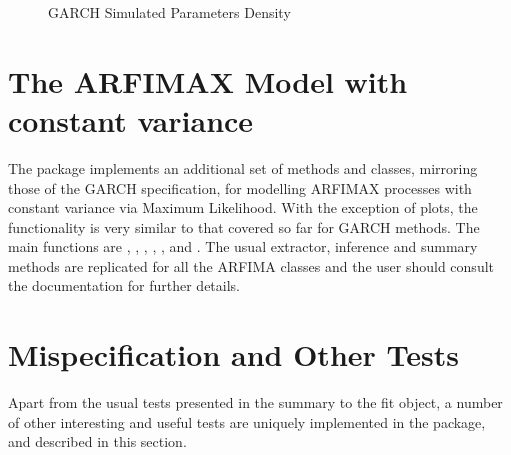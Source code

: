 \begin{landscape}
\begin{figure}[!ht]
\caption[GARCH Simulated Parameters Density]{GARCH Simulated Parameters Density}\label{fig:dist3}
\end{figure}
\end{landscape}
\section{The ARFIMAX Model with constant variance}\label{section:arfima}
The \verb@rugarch@ package implements an additional set of methods and classes,
mirroring those of the GARCH specification, for modelling ARFIMAX processes
with constant variance via Maximum Likelihood. With the exception of plots, the
functionality is very similar to that covered so far for GARCH methods. The main
functions are \verb@arfimaspec@, \verb@arfimafit@, \verb@arfimaforecast@,
\verb@arfimasim@, \verb@arfimapath@, \verb@arfimadistirbution@ and \verb@arfimaroll@.
The usual extractor, inference and summary methods are replicated for all the
ARFIMA classes and the user should consult the documentation for further details.

\section{Mispecification and Other Tests}
Apart from the usual tests presented in the summary to the fit object, a number
of other interesting and useful tests are uniquely implemented in the \verb@rugarch@
package, and described in this section.
